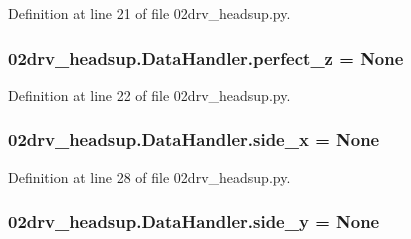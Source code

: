 Definition at line 21 of file 02drv\+\_\+headsup.\+py.

\subsubsection[{\texorpdfstring{perfect\+\_\+z}{perfect_z}}]{\setlength{\rightskip}{0pt plus 5cm}02drv\+\_\+headsup.\+Data\+Handler.\+perfect\+\_\+z = None\hspace{0.3cm}{\ttfamily [static]}}\hypertarget{class02drv__headsup_1_1_data_handler_af2dafb674f19f2ed1da559c0f6de0aeb}{}\label{class02drv__headsup_1_1_data_handler_af2dafb674f19f2ed1da559c0f6de0aeb}


Definition at line 22 of file 02drv\+\_\+headsup.\+py.

\subsubsection[{\texorpdfstring{side\+\_\+x}{side_x}}]{\setlength{\rightskip}{0pt plus 5cm}02drv\+\_\+headsup.\+Data\+Handler.\+side\+\_\+x = None\hspace{0.3cm}{\ttfamily [static]}}\hypertarget{class02drv__headsup_1_1_data_handler_a7b97033e8a24f63097b4fd3387a616c4}{}\label{class02drv__headsup_1_1_data_handler_a7b97033e8a24f63097b4fd3387a616c4}


Definition at line 28 of file 02drv\+\_\+headsup.\+py.

\subsubsection[{\texorpdfstring{side\+\_\+y}{side_y}}]{\setlength{\rightskip}{0pt plus 5cm}02drv\+\_\+headsup.\+Data\+Handler.\+side\+\_\+y = None\hspace{0.3cm}{\ttfamily [static]}}\hypertarget{class02drv__headsup_1_1_data_handler_aa01a0cfdb2e68b636324c97f0d8799eb}{}\label{class02drv__headsup_1_1_data_handler_aa01a0cfdb2e68b636324c97f0d8799eb}


